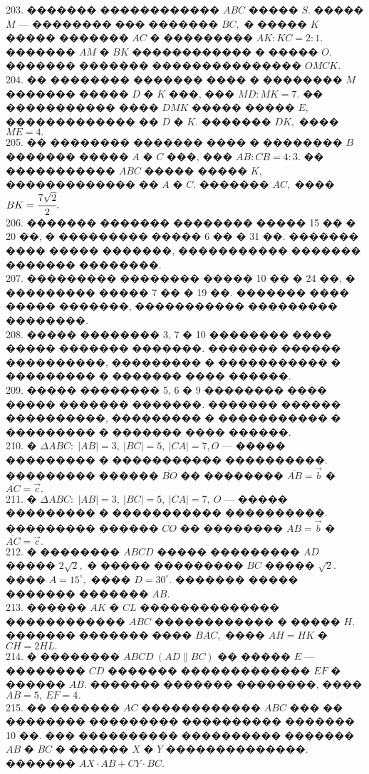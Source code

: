\documentclass[12pt]{article}
\begin{document}
203. ������� ������������ $ABC$ ����� $S.$ ����� $M$ --- �������� ��� ������� $BC,$ � ����� $K$ ����� ������� $AC$ � ��������� $AK:KC=2:1.$ ������� $AM$ � $BK$ ������������ � ����� $O.$ ������� ������� ��������������� $OMCK.$\\
204. �� �������� ������� ���� � �������� $M$ ������� ����� $D$ � $K$ ���, ��� $MD : MK = 7.$ ��
����������� ���� $DMK$ ����� ����� $E,$ ������������� �� $D$ � $K.$ ������� $DK,$ ���� $ME = 4.$\\
205. �� �������� ������� ���� � �������� $B$ ������� ����� $A$ � $C$ ���, ��� $AB : CB = 4 : 3.$ ��
����������� $ABC$ ����� ����� $K,$ ������������� �� $A$ � $C.$ ������� $AC,$ ���� $BK =\cfrac{7\sqrt{2}}{2}.$\\
206. ������� ������� �������� ����� 15 �� � 20 ��, � ��������� ����� 6 �� � 31 ��. ������� ���� ����� �������, ����������� ������� ������� ��������.\\
207. ��������� �������� ����� 10 �� � 24 ��, � ��������� ����� 7 �� � 19 ��. ������� ���� ����� �������, ����������� ��������� ��������.\\
208. ����� �������� 3, 7 � 10 �������� ���� ����� ������� �������. ������� ������ ����������, ��������� � ����������� � ��������� � ������� ���� ������.\\
209. ����� �������� 5, 6 � 9 �������� ���� ����� ������� �������. ������� ������ ����������, ��������� � ����������� � ��������� � ������� ���� ������.\\
210. � $\Delta ABC:\; |AB| = 3,\ |BC| = 5,\ |CA| = 7, O$ --- ����� ��������� � ����������� ����������.
��������� ������  $\overline{BO}$ �� ��������  $\overline{AB}=\vec{b}$ �  $\overline{AC}=\vec{c}.$\\
211. � $\Delta ABC:\; |AB| = 3,\ |BC| = 5,\ |CA| = 7,\ O$ --- ����� ��������� � ����������� ����������. ��������� ������ $\overline{CO}$ �� ��������
$\overline{AB}=\vec{b}$ �  $\overline{AC}=\vec{c}.$\\
212. � ��������  $ABCD$ ����� ���������  $AD$ �����  $2\sqrt{2},$ � ����� ���������  $BC$ �����  $\sqrt{2}.$ ���� $A=15^\circ,$
���� $D=30^\circ.$ ������� ����� ������� �������  $AB.$\\
213. ������  $AK$ �  $CL$ �������������� ������������  $ABC$ ������������ � �����  $H.$ ������� ������� ����
$BAC,$ ����  $AH=HK$ �  $CH=2HL.$\\
214. � ��������  $ABCD\  (AD\parallel BC)$ �� �����  $E$ --- ��������  $CD$ ������� �������������  $EF$ � ������  $AB.$
������� ������� ��������, ����  $AB=5,\ EF=4.$\\
215. �� �������  $AC$ ������������  $ABC$ ��� �� �������� ��������� ���������� ������� 10 ��. ���
���������� ���������� �������  $AB$ �  $BC$ � ������  $X$ �  $Y$ ��������������. �������  $AX\cdot AB + CY\cdot BC.$
\newpage
\end{document}
